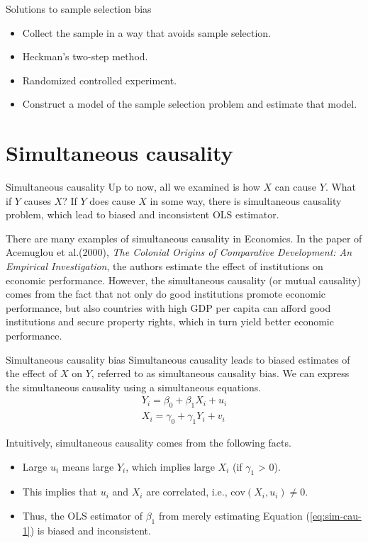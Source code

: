 \documentclass[presentation,10pt]{beamer}
\newcommand{\cov}{\mathrm{cov}}
\begin{document}
\begin{frame}[label={sec:orgabd2cad}]{Solutions to sample selection bias}
\begin{itemize}
\item Collect the sample in a way that avoids sample selection.
\item Heckman's two-step method.
\item Randomized controlled experiment.
\item Construct a model of the sample selection problem and estimate that
model.
\end{itemize}
\end{frame}

\section{Simultaneous causality}
\label{sec:orgbf32072}

\begin{frame}[label={sec:orga6f0a9a}]{Simultaneous causality}
Up to now, all we examined is how \(X\) can cause \(Y\). What if \(Y\) causes
\(X\)? If \(Y\) does cause \(X\) in some way, there is \alert{simultaneous
causality} problem, which lead to biased and inconsistent OLS
estimator. 

\vspace{0.3cm}
There are many examples of simultaneous causality in Economics. In the
paper of Acemuglou et al.(2000), \emph{The Colonial Origins of Comparative
Development: An Empirical Investigation}, the authors estimate the
effect of institutions on economic performance. However, the
simultaneous causality (or mutual causality) comes from the fact that
not only do good institutions promote economic performance, but also
countries with high GDP per capita can afford good institutions and
secure property rights, which in turn yield better economic
performance. 
\end{frame}

\begin{frame}[label={sec:org7de73b0}]{Simultaneous causality bias}
Simultaneous causality leads to biased estimates of the effect of \(X\)
on \(Y\), referred to as \alert{simultaneous causality bias}. We can express
the simultaneous causality using a simultaneous equations.
\begin{gather}
Y_i = \beta_0 + \beta_1 X_i + u_i \label{eq:sim-cau-1} \\
X_i = \gamma_0 + \gamma_1 Y_i + v_i \label{eq:sim-cau-2}
\end{gather}

Intuitively, simultaneous causality comes from the following facts. 
\begin{itemize}
\item Large \(u_i\) means large \(Y_i\), which implies large \(X_i\) (if
\(\gamma_1\) > 0).
\item This implies that \(u_i\) and \(X_i\) are correlated, i.e., \(\cov(X_i,
  u_i) \neq 0\).
\item Thus, the OLS estimator of \(\beta_1\) from merely estimating Equation
(\ref{eq:sim-cau-1}) is biased and inconsistent.
\end{itemize}
\end{frame}
\end{document}
